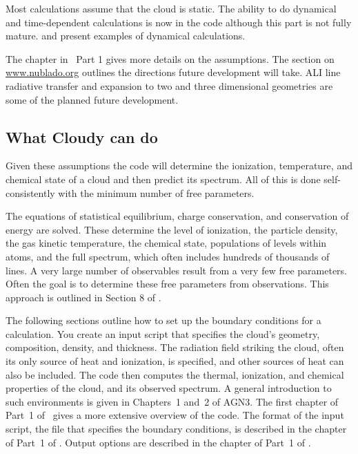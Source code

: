 \documentclass[12pt,twoside]{article}
\begin{document}
Most calculations assume that the cloud is static.
The ability to do dynamical and time-dependent calculations is
now in the code although this part is not fully mature.
\citet{HenneyEtAl05} and \citet{HenneyEtAl07} present
examples of dynamical calculations.

The  chapter in \Hazy\ Part 1 gives more details on the assumptions.
The section  on \href{http://www.nublado.org}{www.nublado.org}
outlines the directions future development will take.
ALI line radiative transfer and expansion to two and three dimensional geometries
are some of the planned future development.

\subsection{What Cloudy can do}

Given these assumptions the code will determine the ionization,
temperature, and chemical state of a cloud and then predict its spectrum.
All of this is done self-consistently with the minimum number of free
parameters.

The equations of statistical equilibrium, charge conservation, and
conservation of energy are solved.  These determine the level of ionization,
the particle density, the gas kinetic temperature, the chemical state,
populations of levels within atoms, and the full spectrum, which often
includes hundreds of thousands of lines.  A very large number of observables
result from a very few free parameters.  Often the goal is to determine these
free parameters from observations.  This approach is outlined in Section
8 of \citet{Ferland03}.

The following sections outline how to set up the boundary conditions
for a calculation.  You create an input script that specifies the cloud's
geometry, composition, density, and thickness.  The radiation field striking
the cloud, often its only source of heat and ionization, is specified, and
other sources of heat can also be included.  The code then computes the
thermal, ionization, and chemical properties of the cloud, and its observed
spectrum.  A general introduction to such environments is given in
Chapters~1 and~2 of AGN3.  The first chapter
of Part~1 of \Hazy\ gives a more extensive
overview of the code.
The format of the input script, the file that
specifies the boundary conditions, is described in the chapter
 of Part~1 of \Hazy.
Output options are described in the
chapter  of Part~1 of \Hazy.
\end{document}
